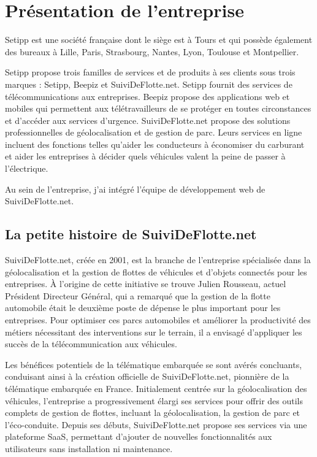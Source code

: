 \section{Présentation de l'entreprise}\label{sec:presentation-entreprise}

Setipp est une société française dont le siège est à Tours et qui possède également des bureaux à Lille, Paris, Strasbourg, Nantes, Lyon, Toulouse et Montpellier.

Setipp propose trois familles de services et de produits à ses clients sous trois marques : Setipp, Beepiz et SuiviDeFlotte.net. Setipp fournit des services de télécommunications aux entreprises. Beepiz propose des applications web et mobiles qui permettent aux télétravailleurs de se protéger en toutes circonstances et d'accéder aux services d'urgence. SuiviDeFlotte.net propose des solutions professionnelles de géolocalisation et de gestion de parc. Leurs services en ligne incluent des fonctions telles qu'aider les conducteurs à économiser du carburant et aider les entreprises à décider quels véhicules valent la peine de passer à l'électrique.

Au sein de l'entreprise, j'ai intégré l'équipe de développement web de SuiviDeFlotte.net.

\subsection{La petite histoire de SuiviDeFlotte.net}\label{subsec:histoire-sdf}

SuiviDeFlotte.net, créée en 2001, est la branche de l'entreprise spécialisée dans la géolocalisation et la gestion de flottes de véhicules et d'objets connectés pour les entreprises. À l'origine de cette initiative se trouve Julien Rousseau, actuel Président Directeur Général, qui a remarqué que la gestion de la flotte automobile était le deuxième poste de dépense le plus important pour les entreprises. Pour optimiser ces parcs automobiles et améliorer la productivité des métiers nécessitant des interventions sur le terrain, il a envisagé d'appliquer les succès de la télécommunication aux véhicules.

Les bénéfices potentiels de la télématique embarquée se sont avérés concluants, conduisant ainsi à la création officielle de SuiviDeFlotte.net, pionnière de la télématique embarquée en France. Initialement centrée sur la géolocalisation des véhicules, l'entreprise a progressivement élargi ses services pour offrir des outils complets de gestion de flottes, incluant la géolocalisation, la gestion de parc et l'éco-conduite. Depuis ses débuts, SuiviDeFlotte.net propose ses services via une plateforme SaaS, permettant d'ajouter de nouvelles fonctionnalités aux utilisateurs sans installation ni maintenance.

